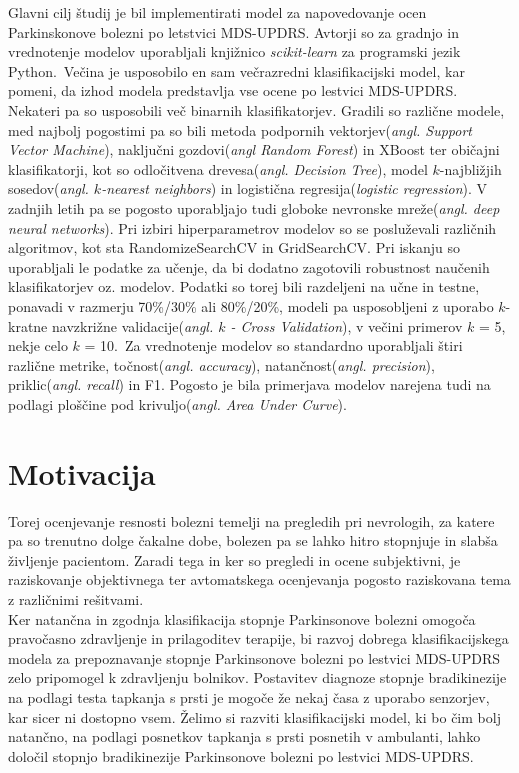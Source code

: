 \documentclass[a4paper,12pt]{article}
\begin{document}
Glavni cilj študij je bil implementirati model za napovedovanje ocen Parkinskonove bolezni po letstvici 
MDS-UPDRS. Avtorji so za gradnjo in vrednotenje modelov uporabljali knjižnico \textit{scikit-learn} za programski 
jezik Python.\
Večina je usposobilo en sam večrazredni klasifikacijski model, kar pomeni, da izhod modela predstavlja vse 
ocene po lestvici MDS-UPDRS. Nekateri pa so usposobili več binarnih klasifikatorjev. Gradili so različne 
modele, med najbolj pogostimi pa so bili metoda podpornih vektorjev(\textit{angl. Support Vector Machine}), naključni 
gozdovi(\textit{angl Random Forest}) in XBoost ter običajni klasifikatorji, kot so odločitvena drevesa(\textit{angl. Decision 
Tree}), model $k$-najbližjih sosedov(\textit{angl. $k$-nearest neighbors}) in logistična regresija(\textit{logistic 
regression}). V zadnjih letih pa se pogosto uporabljajo tudi globoke nevronske mreže(\textit{angl. deep neural 
networks}). Pri izbiri hiperparametrov modelov so se posluževali različnih algoritmov, kot sta 
RandomizeSearchCV in GridSearchCV. Pri iskanju so uporabljali le podatke za učenje, da bi dodatno 
zagotovili robustnost naučenih klasifikatorjev oz. modelov. Podatki so torej bili razdeljeni na učne in 
testne, ponavadi v razmerju 70\%/30\% ali 80\%/20\%, modeli pa usposobljeni z uporabo $k$-kratne navzkrižne 
validacije(\textit{angl. $k$ - Cross Validation}), v večini primerov $k$ = 5, nekje celo $k$ = 10.\
Za vrednotenje modelov so standardno uporabljali štiri različne metrike, točnost(\textit{angl. accuracy}), 
natančnost(\textit{angl. precision}), priklic(\textit{angl. recall}) in F1. Pogosto je bila primerjava modelov narejena 
tudi na podlagi ploščine pod krivuljo(\textit{angl. Area Under Curve}). 

\section{Motivacija}

Torej ocenjevanje resnosti bolezni temelji na pregledih pri nevrologih, za katere pa so trenutno dolge 
čakalne dobe, bolezen pa se lahko hitro stopnjuje in slabša življenje pacientom. Zaradi tega in ker so 
pregledi in ocene subjektivni, je raziskovanje objektivnega ter avtomatskega ocenjevanja pogosto 
raziskovana tema z različnimi rešitvami. \\

Ker natančna in zgodnja klasifikacija stopnje Parkinsonove bolezni omogoča pravočasno zdravljenje in 
prilagoditev terapije, bi razvoj dobrega klasifikacijskega modela za prepoznavanje stopnje Parkinsonove 
bolezni po lestvici MDS-UPDRS zelo pripomogel k zdravljenju bolnikov. Postavitev diagnoze stopnje 
bradikinezije na podlagi testa tapkanja s prsti je mogoče že nekaj časa z uporabo senzorjev, kar sicer ni 
dostopno vsem. Želimo si razviti klasifikacijski model, ki bo čim bolj natančno, na podlagi posnetkov tapkanja 
s prsti posnetih v ambulanti, lahko določil stopnjo bradikinezije Parkinsonove bolezni po lestvici MDS-UPDRS.
\end{document}
